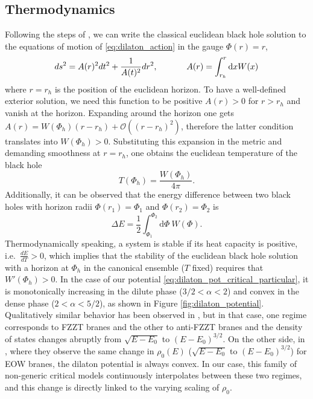 \documentclass[a4paper,11pt]{article}
\newcommand{\rmd}{\mathrm{d}}
\begin{document}
\subsection{Thermodynamics}
Following the steps of \cite{Witten:2020ert}, we can write the classical euclidean black hole solution to the equations of motion of \eqref{eq:dilaton_action} in the gauge $\Phi(r)=r$,
      \begin{equation}
       ds^2=A(r)^2dt^2+\frac{1}{A(t)^2}dr^2, \hspace{12mm} A(r)=\int_{r_h}^r \rmd x W(x)
      \end{equation}
where $r=r_h$ is the position of the euclidean horizon. To have a well-defined exterior solution, we need this function to be positive $A(r)>0$ for $r>r_h$ and vanish at the horizon. Expanding around the horizon one gets $A(r)=W(\Phi_h)(r-r_h)+\mathcal{O}((r-r_h)^2)$, therefore the latter condition translates into $W(\Phi_h)>0$. Substituting this expansion in the metric and demanding smoothness at $r=r_h$, one obtains the euclidean temperature of the black hole 
\begin{equation}
    T(\Phi_h)=\frac{W(\Phi_h)}{4\pi}.
\end{equation}
Additionally, it can be observed that the energy difference between two black holes with horizon radii $\Phi(r_1) = \Phi_1$ and $\Phi(r_2) = \Phi_2$ is
\begin{equation}
    \Delta E=\frac{1}{2}\int_{\Phi_1}^{\Phi_2}\rmd \Phi \ W(\Phi).
\end{equation}
Thermodynamically speaking, a system is stable if its heat capacity is positive, i.e.\ $\frac{dE}{dT}>0$, which implies that the stability of the euclidean black hole solution with a horizon at $\Phi_h$ in the canonical ensemble ($T$ fixed) requires that $W'(\Phi_h)>0$. In the case of our potential \eqref{eq:dilaton_pot_critical_particular}, it is monotonically increasing in the dilute phase ($3/2<\alpha<2$) and convex in the dense phase ($2<\alpha<5/2$), as shown in Figure \ref{fig:dilaton_potential}. Qualitatively similar behavior has been observed in \cite{Okuyama:2021Page}, but in that case, one regime corresponds to FZZT branes and the other to anti-FZZT branes and the density of states changes abruptly from $\sqrt{E-E_0}$ to $(E-E_0)^{3/2}$. On the other side, in \cite{Gao:2021uro}, where they observe the same change in $\rho_0(E)$ ($\sqrt{E-E_0}$ to $(E-E_0)^{3/2}$) for EOW branes, the dilaton potential is always convex. In our case, this family of non-generic critical models continuously interpolates between these two regimes, and this change is directly linked to the varying scaling of $\rho_0$. \\
\end{document}

